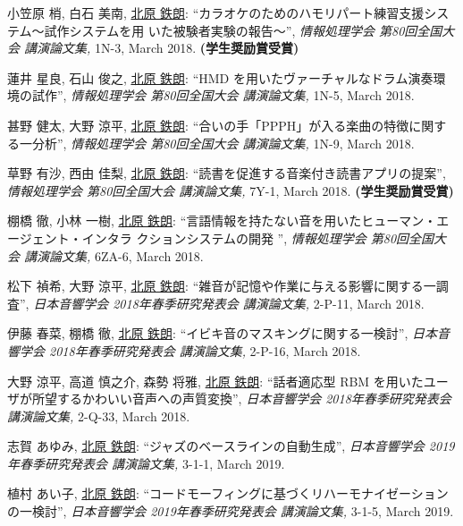 \begin{Enumerate}
\item 
小笠原 梢, 
白石 美南, 
\underline{北原 鉄朗}: 
    ``カラオケのためのハモリパート練習支援システム〜試作システムを用
いた被験者実験の報告〜'', 
    {\it 情報処理学会 第80回全国大会 講演論文集,
    } 1N-3, March 2018. 
{\bf (学生奨励賞受賞)}
\item 
蓮井 星良, 
石山 俊之, 
\underline{北原 鉄朗}: 
    ``HMD を用いたヴァーチャルなドラム演奏環境の試作'', 
    {\it 情報処理学会 第80回全国大会 講演論文集,
    } 1N-5, March 2018. 

\item 
甚野 健太, 
大野 涼平, 
\underline{北原 鉄朗}: 
    ``合いの手「PPPH」が入る楽曲の特徴に関する一分析'', 
    {\it 情報処理学会 第80回全国大会 講演論文集,
    } 1N-9, March 2018. 

\item 
草野 有沙, 
西由 佳梨, 
\underline{北原 鉄朗}: 
    ``読書を促進する音楽付き読書アプリの提案'', 
    {\it 情報処理学会 第80回全国大会 講演論文集,
    } 7Y-1, March 2018. 
{\bf (学生奨励賞受賞)}
\item 
棚橋 徹, 
小林 一樹, 
\underline{北原 鉄朗}: 
    ``言語情報を持たない音を用いたヒューマン・エージェント・インタラ クションシステムの開発 '', 
    {\it 情報処理学会 第80回全国大会 講演論文集,
    } 6ZA-6, March 2018. 

\item 
松下 禎希, 
大野 涼平, 
\underline{北原 鉄朗}: 
    ``雑音が記憶や作業に与える影響に関する一調査'', 
    {\it 日本音響学会 2018年春季研究発表会 講演論文集,
    } 2-P-11, March 2018. 

\item 
伊藤 春菜, 
棚橋 徹, 
\underline{北原 鉄朗}: 
    ``イビキ音のマスキングに関する一検討'', 
    {\it 日本音響学会 2018年春季研究発表会 講演論文集,
    } 2-P-16, March 2018. 

\item 
大野 涼平, 
高道 慎之介, 
森勢 将雅, 
\underline{北原 鉄朗}: 
    ``話者適応型 RBM を用いたユーザが所望するかわいい音声への声質変換'', 
    {\it 日本音響学会 2018年春季研究発表会 講演論文集,
    } 2-Q-33, March 2018. 

\item 
志賀 あゆみ, 
\underline{北原 鉄朗}: 
    ``ジャズのベースラインの自動生成'', 
    {\it 日本音響学会 2019年春季研究発表会 講演論文集,
    } 3-1-1, March 2019. 

\item 
植村 あい子, 
\underline{北原 鉄朗}: 
    ``コードモーフィングに基づくリハーモナイゼーションの一検討'', 
    {\it 日本音響学会 2019年春季研究発表会 講演論文集,
    } 3-1-5, March 2019. 


\end{Enumerate}
